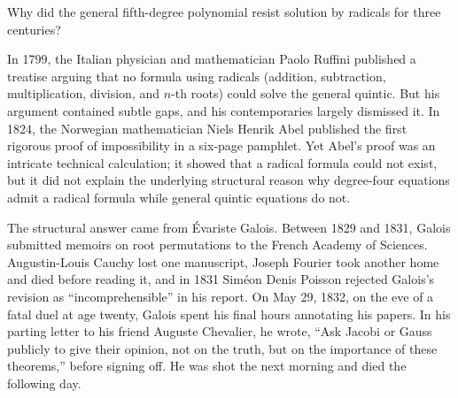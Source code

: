 \begin{historybox}
Why did the general fifth-degree polynomial resist solution by radicals for three centuries?

In 1799, the Italian physician and mathematician Paolo Ruffini published a treatise arguing that no formula using radicals (addition, subtraction, multiplication, division, and $n$-th roots) could solve the general quintic. But his argument contained subtle gaps, and his contemporaries largely dismissed it. In 1824, the Norwegian mathematician Niels Henrik Abel published the first rigorous proof of impossibility in a six-page pamphlet. Yet Abel's proof was an intricate technical calculation; it showed that a radical formula could not exist, but it did not explain the underlying structural reason why degree-four equations admit a radical formula while general quintic equations do not.

The structural answer came from \'{E}variste Galois. Between 1829 and 1831, Galois submitted memoirs on root permutations to the French Academy of Sciences. Augustin-Louis Cauchy lost one manuscript, Joseph Fourier took another home and died before reading it, and in 1831 Sim\'eon Denis Poisson rejected Galois's revision as ``incomprehensible'' in his report. On May 29, 1832, on the eve of a fatal duel at age twenty, Galois spent his final hours annotating his papers. In his parting letter to his friend Auguste Chevalier, he wrote, ``Ask Jacobi or Gauss publicly to give their opinion, not on the truth, but on the importance of these theorems,'' before signing off. He was shot the next morning and died the following day.
\end{historybox}

